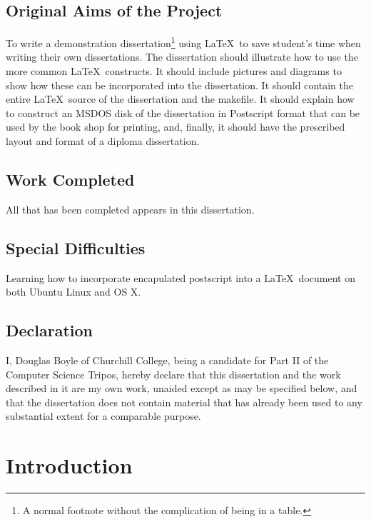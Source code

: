 \documentclass[a4paper,12pt,twoside,openright]{report}
\def\authorname{Douglas Boyle\xspace}
\def\authorcollege{Churchill College\xspace}
\begin{document}
\section*{Original Aims of the Project}

To write a demonstration dissertation\footnote{A normal footnote without the
complication of being in a table.} using \LaTeX\ to save
student's time when writing their own dissertations. The dissertation
should illustrate how to use the more common \LaTeX\ constructs. It
should include pictures and diagrams to show how these can be
incorporated into the dissertation.  It should contain the entire
\LaTeX\ source of the dissertation and the makefile.  It should
explain how to construct an MSDOS disk of the dissertation in
Postscript format that can be used by the book shop for printing, and,
finally, it should have the prescribed layout and format of a diploma
dissertation.


\section*{Work Completed}

All that has been completed appears in this dissertation.

\section*{Special Difficulties}

Learning how to incorporate encapulated postscript into a \LaTeX\
document on both Ubuntu Linux and OS X.
 
\newpage
\section*{Declaration}

I, \authorname of \authorcollege, being a candidate for Part II of the Computer
Science Tripos, hereby declare
that this dissertation and the work described in it are my own work,
unaided except as may be specified below, and that the dissertation
does not contain material that has already been used to any substantial
extent for a comparable purpose.

\bigskip
{}

\medskip
{}


\chapter{Introduction}
\end{document}
